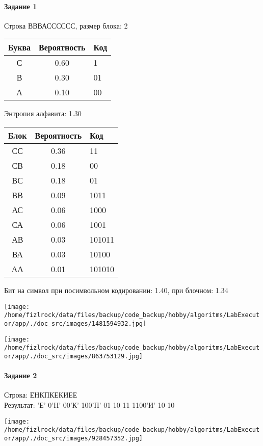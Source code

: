 \documentclass[a4paper, 12pt]{article}
\begin{document}
\paragraph{Задание 1}

Строка ВВВАСССССС, размер блока: 2
\begin{center}
 \begin{tabular}{ |c|c|l| } 
  \hline
     Буква & Вероятность & Код\\ \hline
С & 0.60 & 1\\\hline
В & 0.30 & 01\\\hline
А & 0.10 & 00
\\ \hline \end{tabular}
\end{center}
Энтропия алфавита: 1.30
\begin{center}
 \begin{tabular}{ |c|c|l| } 
  \hline
     Блок & Вероятность & Код\\ \hline
СС & 0.36 & 11\\\hline
СВ & 0.18 & 00\\\hline
ВС & 0.18 & 01\\\hline
ВВ & 0.09 & 1011\\\hline
АС & 0.06 & 1000\\\hline
СА & 0.06 & 1001\\\hline
АВ & 0.03 & 101011\\\hline
ВА & 0.03 & 10100\\\hline
АА & 0.01 & 101010
\\ \hline \end{tabular}
\end{center}
Бит на символ при посимвольном кодировании: 1.40, при блочном: 1.34

\texttt{[image: /home/fizlrock/data/files/backup/code\_backup/hobby/algoritms/LabExecutor/app/./doc\_src/images/1481594932.jpg]}

\texttt{[image: /home/fizlrock/data/files/backup/code\_backup/hobby/algoritms/LabExecutor/app/./doc\_src/images/863753129.jpg]}
\pagebreak
\paragraph{Задание 2}

Строка: 
ЕНКПКЕКИЕЕ\\
Результат: 'Е' 0'Н' 00'К' 100'П' 01 10 11 1100'И' 10 10

\texttt{[image: /home/fizlrock/data/files/backup/code\_backup/hobby/algoritms/LabExecutor/app/./doc\_src/images/928457352.jpg]}
\end{document}
